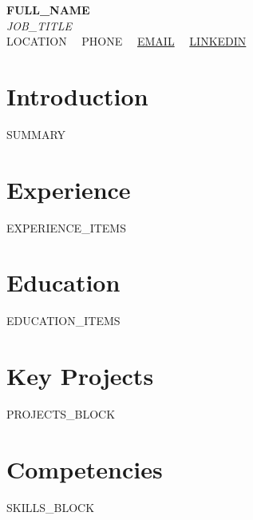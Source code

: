 \documentclass[10pt,letterpaper]{article}
\begin{document}
\begin{center}
  {\huge \textbf{{{FULL_NAME}}}} \\[4pt]
  {\normalsize \textit{{{JOB_TITLE}}}} \\[8pt]
  \small
  {{LOCATION}} \ \textbar \ 
  {{PHONE}} \ \textbar \ 
  \href{mailto:{{EMAIL}}}{{{EMAIL}}} \ \textbar \ 
  \href{https://{{LINKEDIN}}}{{{LINKEDIN}}}
\end{center}

\vspace{8pt}

\section{Introduction}
\small
{{SUMMARY}}

\section{Experience}
\small
{{EXPERIENCE_ITEMS}}

\section{Education}
\small
{{EDUCATION_ITEMS}}

\section{Key Projects}
\small
{{PROJECTS_BLOCK}}

\section{Competencies}
\small
{{SKILLS_BLOCK}}
\end{document}
